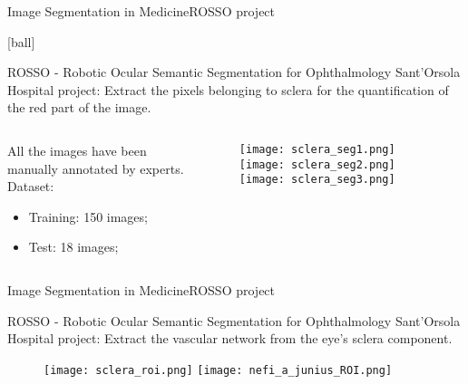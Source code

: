 \documentclass[10pt, technote, oribibl, unicode]{beamer}
\begin{document}
\begin{frame}{Image Segmentation in Medicine}{ROSSO project}

  [ball]

  \begin{alertblock}{ROSSO - Robotic Ocular Semantic Segmentation for Ophthalmology}
    \scriptsize{Sant'Orsola Hospital project: Extract the pixels belonging to sclera for the quantification of the red part of the image.}
  \end{alertblock}

  \begin{columns}
    \begin{column}{0.3\linewidth}
      \scriptsize{All the images have been manually annotated by experts.}
      \scriptsize{Dataset:}
      \begin{itemize}
        \item Training: 150 images;
        \item Test: 18 images;
      \end{itemize}
    \end{column}
    \begin{column}{0.7\linewidth}
      \begin{figure}
        \begin{overprint}
          \centering\texttt{[image: sclera\_seg1.png]}
          \centering\texttt{[image: sclera\_seg2.png]}
          \centering\texttt{[image: sclera\_seg3.png]}
        \end{overprint}
      \end{figure}
    \end{column}
  \end{columns}

\end{frame}

\begin{frame}{Image Segmentation in Medicine}{ROSSO project}


  \begin{alertblock}{ROSSO - Robotic Ocular Semantic Segmentation for Ophthalmology}
    \scriptsize{Sant'Orsola Hospital project: Extract the vascular network from the eye's sclera component.}
  \end{alertblock}

  \begin{figure}
    \begin{overprint}
      \centering\texttt{[image: sclera\_roi.png]}
      \centering\texttt{[image: nefi\_a\_junius\_ROI.png]}
    \end{overprint}
  \end{figure}

\end{frame}
\end{document}
